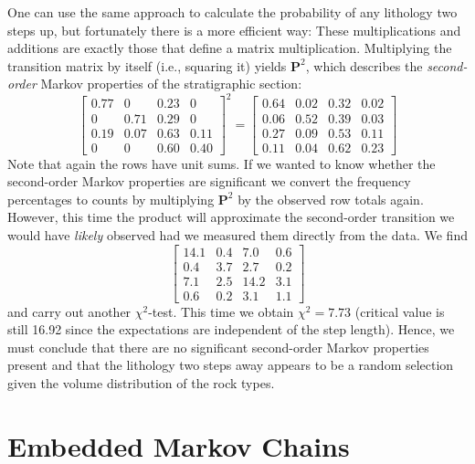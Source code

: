 One can use the same approach to calculate the probability of any lithology two steps up, but 
fortunately there is a more efficient way: These multiplications and additions are exactly those that 
define a matrix multiplication.  Multiplying the transition matrix by itself (i.e., squaring it) yields
$\mathbf{P}^2$, which describes the \emph{second-order} Markov properties of the stratigraphic section:
\begin{equation}
\left [ \begin{array}{rrrr}
0.77 & 0 & 0.23 & 0 \\
0 & 0.71 & 0.29 & 0 \\
0.19 & 0.07 & 0.63 & 0.11 \\
0 & 0 & 0.60 & 0.40 \end{array} \right ]^2 = \left [ \begin{array}{rrrr}
0.64 & 0.02 & 0.32 & 0.02 \\
0.06 & 0.52 & 0.39 & 0.03\\
0.27 & 0.09 & 0.53 & 0.11 \\
0.11 & 0.04 & 0.62 & 0.23
\end{array} \right ]
\end{equation}
Note that again the rows have unit sums.  If we wanted to know whether the second-order Markov 
properties are significant we convert the frequency percentages to counts by multiplying $\mathbf{P}^2$
by the observed row totals again.  However, this time the product will approximate the second-order
transition we would have \emph{likely} observed had we measured them directly from the data.  We find
\begin{equation}
\left[ \begin{array}{rrrr}
14.1 & 0.4 & 7.0 & 0.6\\
0.4 & 3.7 & 2.7 & 0.2 \\
7.1 & 2.5 & 14.2 & 3.1 \\
0.6 & 0.2 & 3.1 & 1.1
\end{array} \right ]
\end{equation}
and carry out another 
$\chi^2$-test.  This time we obtain $\chi^2 = 7.73$ (critical value is still 16.92 since the expectations
are independent of the step length).  Hence, we must conclude that there are no 
significant second-order Markov properties present and that the lithology two steps away appears to 
be a random selection given the volume distribution of the rock types.

\section{Embedded Markov Chains}
\label{sec:embmarkov}

